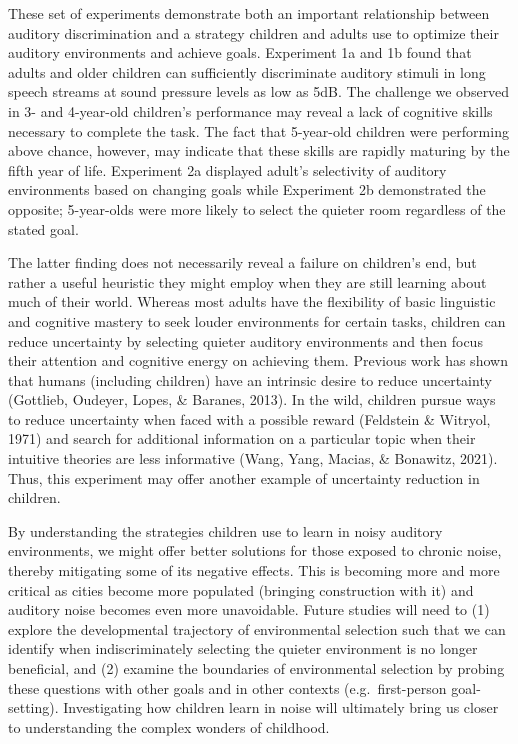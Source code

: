 \documentclass[10pt, letterpaper]{article}
\begin{document}
These set of experiments demonstrate both an important relationship
between auditory discrimination and a strategy children and adults use
to optimize their auditory environments and achieve goals. Experiment 1a
and 1b found that adults and older children can sufficiently
discriminate auditory stimuli in long speech streams at sound pressure
levels as low as 5dB. The challenge we observed in 3- and 4-year-old
children's performance may reveal a lack of cognitive skills necessary
to complete the task. The fact that 5-year-old children were performing
above chance, however, may indicate that these skills are rapidly
maturing by the fifth year of life. Experiment 2a displayed adult's
selectivity of auditory environments based on changing goals while
Experiment 2b demonstrated the opposite; 5-year-olds were more likely to
select the quieter room regardless of the stated goal.

The latter finding does not necessarily reveal a failure on children's
end, but rather a useful heuristic they might employ when they are still
learning about much of their world. Whereas most adults have the
flexibility of basic linguistic and cognitive mastery to seek louder
environments for certain tasks, children can reduce uncertainty by
selecting quieter auditory environments and then focus their attention
and cognitive energy on achieving them. Previous work has shown that
humans (including children) have an intrinsic desire to reduce
uncertainty (Gottlieb, Oudeyer, Lopes, \& Baranes, 2013). In the wild,
children pursue ways to reduce uncertainty when faced with a possible
reward (Feldstein \& Witryol, 1971) and search for additional
information on a particular topic when their intuitive theories are less
informative (Wang, Yang, Macias, \& Bonawitz, 2021). Thus, this
experiment may offer another example of uncertainty reduction in
children.

By understanding the strategies children use to learn in noisy auditory
environments, we might offer better solutions for those exposed to
chronic noise, thereby mitigating some of its negative effects. This is
becoming more and more critical as cities become more populated
(bringing construction with it) and auditory noise becomes even more
unavoidable. Future studies will need to (1) explore the developmental
trajectory of environmental selection such that we can identify when
indiscriminately selecting the quieter environment is no longer
beneficial, and (2) examine the boundaries of environmental selection by
probing these questions with other goals and in other contexts
(e.g.~first-person goal-setting). Investigating how children learn in
noise will ultimately bring us closer to understanding the complex
wonders of childhood.
\end{document}
